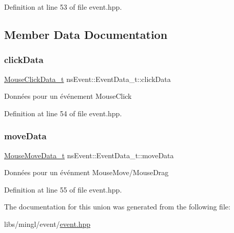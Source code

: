 Definition at line 53 of file event.\+hpp.



\subsection{Member Data Documentation}
\mbox{\label{unionns_event_1_1_event_data__t_ac1478ee3007ce42a653e53c1200625bc}} 
\subsubsection{\texorpdfstring{click\+Data}{clickData}}
{\footnotesize\ttfamily \hyperlink{structns_event_1_1_mouse_click_data__t}{Mouse\+Click\+Data\+\_\+t} ns\+Event\+::\+Event\+Data\+\_\+t\+::click\+Data}

Données pour un événement Mouse\+Click 

Definition at line 54 of file event.\+hpp.

\mbox{\label{unionns_event_1_1_event_data__t_aac7ba31725a75d84fd32ea6a4d865a91}} 
\subsubsection{\texorpdfstring{move\+Data}{moveData}}
{\footnotesize\ttfamily \hyperlink{structns_event_1_1_mouse_move_data__t}{Mouse\+Move\+Data\+\_\+t} ns\+Event\+::\+Event\+Data\+\_\+t\+::move\+Data}

Données pour un événment Mouse\+Move/\+Mouse\+Drag 

Definition at line 55 of file event.\+hpp.



The documentation for this union was generated from the following file\+:\begin{DoxyCompactItemize}
\item 
libs/mingl/event/\hyperlink{event_8hpp}{event.\+hpp}\end{DoxyCompactItemize}

